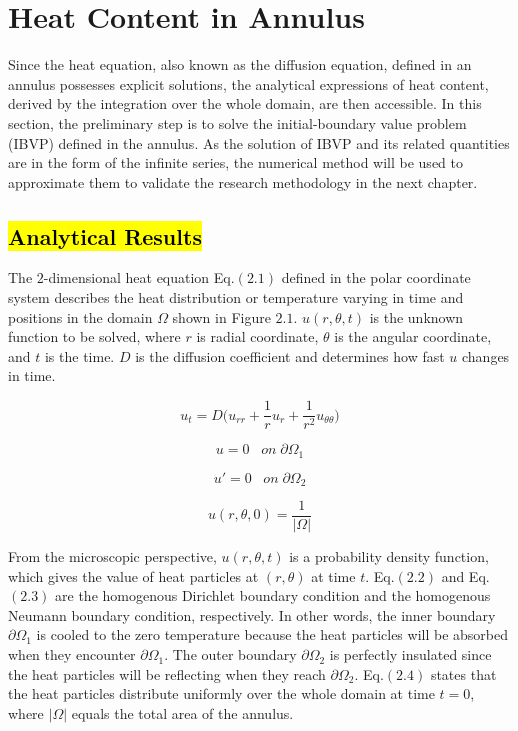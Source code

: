
\section{Heat Content in Annulus}

Since the heat equation, also known as the diffusion equation, defined
in an annulus possesses explicit solutions, the analytical expressions
of heat content, derived by the integration over the whole domain, are
then accessible. In this section, the preliminary step is to solve the
initial-boundary value problem (IBVP) defined in the annulus. As the
solution of IBVP and its related quantities are in the form of the
infinite series, the numerical method will be used to approximate them
to validate the research methodology in the next chapter.


\subsection{\textcolor{red}{\textbf{\hl{Analytical Results}}}} %

The $2$-dimensional heat equation \cite{crank1979mathematics}
Eq.$(2.1)$ defined in the polar coordinate system describes the heat
distribution or temperature varying in time and positions in the
domain $\Omega$ shown in Figure $2.1$. $u(r, \theta, t)$ is the
unknown function to be solved, where $r$ is radial coordinate,
$\theta$ is the angular coordinate, and $t$ is the time. $D$ is the
diffusion coefficient and determines how fast $u$ changes in time.

\begin{equation}
  u_t = D \big(u_{rr} + \frac{1}{r} u_r + \frac{1}{r^2} u_{\theta\theta}\big)  
\end{equation}

\begin{equation}
  u = 0 \; \; \; on \; \partial \Omega_1
\end{equation}

\begin{equation}
  u' = 0 \; \; \; on \; \partial \Omega_2
\end{equation}


\begin{equation}
  u(r, \theta, 0) = \frac{1}{|\Omega|}
\end{equation}

From the microscopic perspective, $u(r, \theta, t)$ is a probability
density function, which gives the value of heat particles at $(r,
\theta)$ at time $t$. Eq.$(2.2)$ and Eq.$(2.3)$ are the homogenous
Dirichlet boundary condition and the homogenous Neumann boundary
condition, respectively. In other words, the inner boundary $\partial
\Omega_{1}$ is cooled to the zero temperature because the heat
particles will be absorbed when they encounter $\partial
\Omega_1$. The outer boundary $\partial \Omega_{2}$ is perfectly
insulated since the heat particles will be reflecting when they reach
$\partial \Omega_2$. Eq.$(2.4)$ states that the heat particles
distribute uniformly over the whole domain at time $t=0$, where
$|\Omega|$ equals the total area of the annulus.


